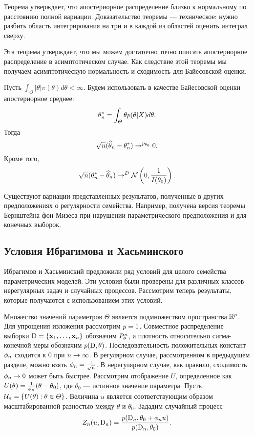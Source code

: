 Теорема утверждает, что апостериорное распределение близко к нормальному по расстоянию полной вариации.
Доказательство теоремы --- техническое: нужно разбить область интегрирования на три и в каждой из областей оценить интеграл сверху.

Эта теорема утверждает, что мы можем достаточно точно описать апостериорное распределение в асимптотическом случае.
Как следствие этой теоремы мы получаем асимптотическую нормальность и сходимость для Байесовской оценки.
\begin{Theorem}
Пусть $\int_\Theta |\theta| \pi(\theta) d\theta < \infty$. 
Будем использовать в качестве Байесовской оценки апостериорное среднее:
\[
\theta^*_n = \int_{\varTheta} \theta p(\theta | X) d\theta.
\]
Тогда
\[
\sqrt{n} (\widehat{\theta}_n - \theta^*_n) \rightarrow^{p_{\theta_0}} 0.
\]
Кроме того, 
\[
\sqrt{n} (\theta^*_n - \widehat{\theta}_n) \rightarrow^{D} \mathcal{N}\left(0, \frac{1}{I(\theta_0)}\right).
\]
\end{Theorem}

Существуют вариации представленных результатов, полученные в других предположениях о регулярности семейства.
Например, получена версия теоремы Бернштейна-фон Мизеса при нарушении параметрического предположения и для конечных выборок.

\subsection{Условия Ибрагимова и Хасьминского}

Ибрагимов и Хасьминский предложили ряд условий для целого семейства параметрических моделей.
Эти условия были проверены для различных классов нерегулярных задач и случайных процессов.
Рассмотрим теперь результаты, которые получаются с использованием этих условий.

Множество значений параметров $\Theta$ является подмножеством пространства $\mathbb{R}^{p}$.
Для упрощения изложения рассмотрим $p = 1$.
Совместное распределение выборки $\mathrm{D} = \{\mathbf{x}_1, \ldots, \mathbf{x}_{n}\}$ обозначим $P_{\theta}^{n}$, а плотность относительно сигма-конечной меры обозначим $p(\mathrm{D}, \theta)$.
Последовательность положительных констант $\phi_{n}$ сходится к $0$ при $n \rightarrow \infty$.
В регулярном случае, рассмотренном в предыдущем разделе, можно взять $\phi_{n} = \frac{1}{\sqrt{n}}$.
В нерегулярном случае, как правило, сходимость $\phi_{n} \rightarrow 0$ может быть быстрее.
Рассмотрим отображение $U$, определенное как $U(\theta) = \frac{1}{\phi_{n}} (\theta - \theta_0)$, где $\theta_0$ --- истинное значение параметра.
Пусть $\mathcal{U}_{n} = \{U(\theta): \theta \in \varTheta \}$.
Величина $u$ является соответствующим образом масштабированной разностью между $\theta$ и $\theta_0$.
Зададим случайный процесс
\[
Z_{n}(u, \mathrm{D}_{n}) = \frac{p(\mathrm{D}_{n}, \theta_0 + \phi_{n} u)}{p(\mathrm{D}_{n}, \theta_0)}.
\]

